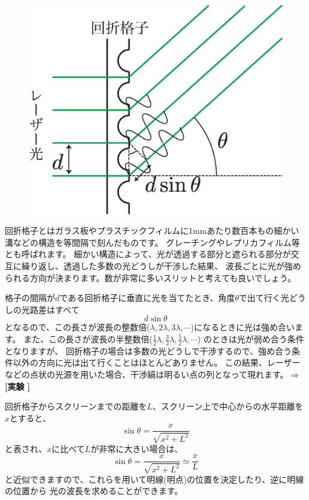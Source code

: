 \begin{figure}
\vspace*{-0.5cm}
\includegraphics[scale=0.5]{03_Interference/grating.eps}
\end{figure}


回折格子とはガラス板やプラスチックフィルムに1mmあたり数百本もの細かい溝などの構造を等間隔で刻んだものです。
グレーチングやレプリカフィルム等とも呼ばれます。
細かい構造によって、光が透過する部分と遮られる部分が交互に繰り返し、透過した多数の光どうしが干渉した結果、
波長ごとに光が強められる方向が決まります。数が非常に多いスリットと考えても良いでしょう。

格子の間隔が$d$である回折格子に垂直に光を当てたとき、角度$\theta$で出て行く光どうしの光路差はすべて
\[
d\sin\theta
\]
となるので、この長さが波長の整数倍($\lambda,2\lambda,3\lambda,\cdots$)になるときに光は強め合います。
また、この長さが波長の半整数倍($\frac{1}{2}\lambda,\frac{3}{2}\lambda,\frac{5}{2}\lambda,\cdots$)
のときは光が弱め合う条件となりますが、
回折格子の場合は多数の光どうしで干渉するので、強め合う条件以外の方向に光は出て行くことはほとんどありません。
この結果、レーザーなどの点状の光源を用いた場合、干渉縞は明るい点の列となって現れます。$\Rightarrow${\bf [実験 ]}

回折格子からスクリーンまでの距離を$L$、スクリーン上で中心からの水平距離を$x$とすると、
\[
\sin \theta = \frac{x}{\sqrt{x^2+L^2}}
\]
と表され、$x$に比べて$L$が非常に大きい場合は、
\[
\sin \theta = \frac{x}{\sqrt{x^2+L^2}} \simeq \frac{x}{L}
\]
と近似できますので、これらを用いて明線(明点)の位置を決定したり、逆に明線の位置から
光の波長を求めることができます。






